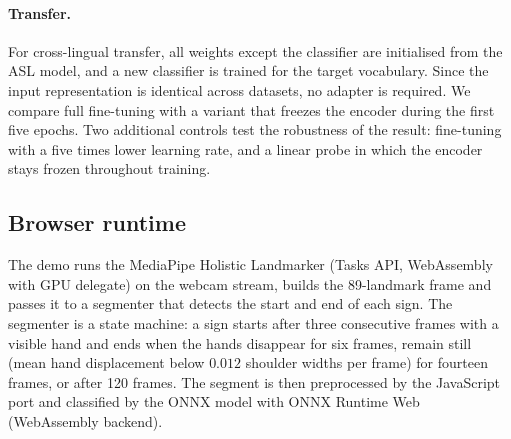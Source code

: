 \paragraph{Transfer.} For cross-lingual transfer, all weights except the classifier are
initialised from the ASL model, and a new classifier is trained for the target vocabulary. Since
the input representation is identical across datasets, no adapter is required. We compare full
fine-tuning with a variant that freezes the encoder during the first five epochs. Two additional
controls test the robustness of the result: fine-tuning with a five times lower learning rate, and
a linear probe in which the encoder stays frozen throughout training.

\subsection{Browser runtime}
\label{sec:runtime}

The demo runs the MediaPipe Holistic Landmarker (Tasks API, WebAssembly with GPU delegate) on the
webcam stream, builds the 89-landmark frame and passes it to a segmenter that detects the start
and end of each sign. The segmenter is a state machine: a sign starts after three consecutive
frames with a visible hand and ends when the hands disappear for six frames, remain still (mean
hand displacement below $0.012$ shoulder widths per frame) for fourteen frames, or after 120
frames. The segment is then preprocessed by the JavaScript port and classified by the ONNX model
with ONNX Runtime Web \citep{onnxruntime} (WebAssembly backend).

